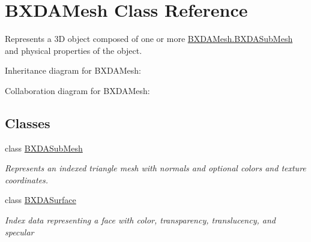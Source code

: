 \hypertarget{class_b_x_d_a_mesh}{}\section{B\+X\+D\+A\+Mesh Class Reference}
\label{class_b_x_d_a_mesh}


Represents a 3D object composed of one or more \hyperlink{class_b_x_d_a_mesh_1_1_b_x_d_a_sub_mesh}{B\+X\+D\+A\+Mesh.\+B\+X\+D\+A\+Sub\+Mesh} and physical properties of the object.  




Inheritance diagram for B\+X\+D\+A\+Mesh\+:


Collaboration diagram for B\+X\+D\+A\+Mesh\+:
\subsection*{Classes}
\begin{DoxyCompactItemize}
\item 
class \hyperlink{class_b_x_d_a_mesh_1_1_b_x_d_a_sub_mesh}{B\+X\+D\+A\+Sub\+Mesh}
\begin{DoxyCompactList}\small\item\em Represents an indexed triangle mesh with normals and optional colors and texture coordinates. \end{DoxyCompactList}\item 
class \hyperlink{class_b_x_d_a_mesh_1_1_b_x_d_a_surface}{B\+X\+D\+A\+Surface}
\begin{DoxyCompactList}\small\item\em Index data representing a face with color, transparency, translucency, and specular \end{DoxyCompactList}\end{DoxyCompactItemize}
